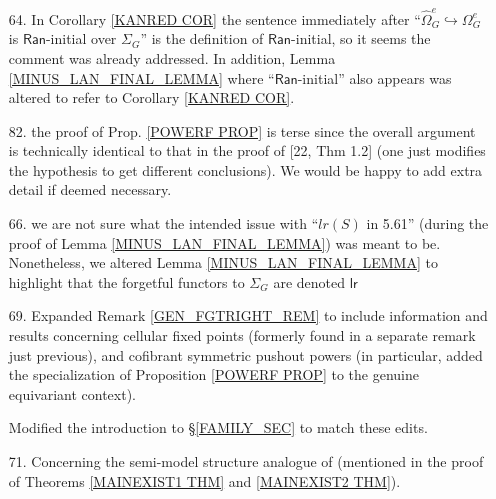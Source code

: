 \documentclass{article}
\begin{document}
\begin{itemize}
	\item[64.]
	In Corollary \ref{KANRED COR} the sentence immediately after ``$\widehat{\Omega}^e_G \hookrightarrow \Omega^e_G$ is
	$\mathsf{Ran}$-initial over $\Sigma_G$''
	is the definition of $\mathsf{Ran}$-initial,
	so it seems the comment was already addressed.
	In addition, Lemma \ref{MINUS_LAN_FINAL_LEMMA} where ``$\mathsf{Ran}$-initial'' also appears was altered to refer to Corollary \ref{KANRED COR}.
	\item[82.] the proof of Prop. \ref{POWERF PROP} is terse since the overall argument is technically identical to that in the proof of [22, Thm 1.2] (one just modifies the hypothesis to get different conclusions).
	We would be happy to add extra detail if deemed necessary. 

	\item[66.] we are not sure what the intended issue with 
	``$lr(S)$ in 5.61'' 
	(during the proof of Lemma \ref{MINUS_LAN_FINAL_LEMMA})
	was meant to be.
	Nonetheless, we altered 
	Lemma \ref{MINUS_LAN_FINAL_LEMMA}
	to highlight that the forgetful functors to $\Sigma_G$
	are denoted $\mathsf{lr}$

  \item[69.] Expanded Remark \ref{GEN_FGTRIGHT_REM} to include information and results concerning
        cellular fixed points (formerly found in a separate remark just previous), and
        cofibrant symmetric pushout powers (in particular, added the specialization of Proposition \ref{POWERF PROP} to the genuine equivariant context).

        Modified the introduction to \S \ref{FAMILY_SEC} to match these edits.
        
	\item[71.] 
	Concerning the semi-model structure analogue of
	\cite[Thm. 11.3.2]{Hi03}
	(mentioned in the proof of Theorems \ref{MAINEXIST1 THM} and \ref{MAINEXIST2 THM}).
	

\end{itemize}
\end{document}
